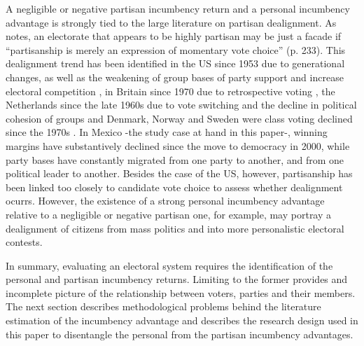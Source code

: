 \documentclass[12pt]{amsart}
\numberwithin{equation}{section}
\theoremstyle{definition}
\theoremstyle{definition}
\theoremstyle{definition}
\begin{document}
A negligible or negative partisan incumbency return and a personal incumbency advantage is strongly tied to the large literature on partisan dealignment. As \citet{beck_1985} notes, an electorate that appears to be highly partisan may be just a facade if ``partisanship is merely an expression of momentary vote choice'' (p. 233). This dealignment trend has been identified in the US since 1953 due to generational changes, as well as the weakening of group bases of party support and increase electoral competition \citep{beck_1977, norpoth_rusk_1982}, in Britain since 1970 due to retrospective voting \citep{alt_1977}, the Netherlands since the late 1960s due to vote switching and the decline in political cohesion of groups \citep{irwin_dittrich} and Denmark, Norway and Sweden were class voting declined since the 1970s \citep{borre_1995}. In Mexico -the study case at hand in this paper-, winning margins have substantively declined since the move to democracy in 2000, while party bases have constantly migrated from one party to another, and from one political leader to another. Besides the case of the US, however, partisanship has been linked too closely to candidate vote choice to assess whether dealignment ocurrs.  However, the existence of a strong personal incumbency advantage relative to a negligible or negative partisan one, for example, may portray a dealignment of citizens from mass politics and into more personalistic electoral contests. 
   
In summary, evaluating an electoral system requires the identification of the personal and partisan incumbency returns. Limiting to the former provides and incomplete picture of the relationship between voters, parties and their members. The next section describes methodological problems behind the literature estimation of the incumbency advantage and describes the research design used in this paper to disentangle the personal from the partisan incumbency advantages. 
\end{document}
